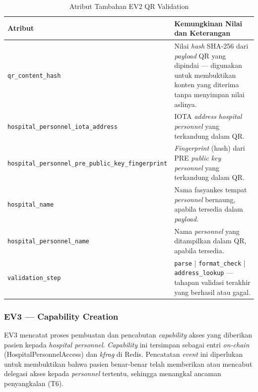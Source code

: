 \begin{table}[htbp]
\centering
\caption{Atribut Tambahan EV2 QR Validation}
\label{tab:ev2-detail}
\renewcommand{\arraystretch}{1.3}
\begin{tabular}{|p{4cm}|p{7.5cm}|}
\hline
\textbf{Atribut} & \textbf{Kemungkinan Nilai dan Keterangan} \\
\hline
\texttt{qr\_content\_hash} &
Nilai \textit{hash} SHA-256 dari \textit{payload} QR yang dipindai ---
digunakan untuk membuktikan konten yang diterima tanpa menyimpan nilai
aslinya. \\
\hline
\texttt{hospital\_personnel\_iota\_address} &
IOTA \textit{address} \textit{hospital personnel} yang terkandung dalam
QR. \\
\hline
\texttt{hospital\_personnel\_pre\_public\_key\_fingerprint} &
\textit{Fingerprint} (hash) dari PRE \textit{public key personnel} yang
terkandung dalam QR. \\
\hline
\texttt{hospital\_name} &
Nama fasyankes tempat \textit{personnel} bernaung, apabila tersedia dalam
\textit{payload}. \\
\hline
\texttt{hospital\_personnel\_name} &
Nama \textit{personnel} yang ditampilkan dalam QR, apabila tersedia. \\
\hline
\texttt{validation\_step} &
\texttt{parse} | \texttt{format\_check} | \texttt{address\_lookup} ---
tahapan validasi terakhir yang berhasil atau gagal. \\
\hline
\end{tabular}
\end{table}

\subsubsection{EV3 --- Capability Creation}
\label{subsec:ev3-capability-creation}

EV3 mencatat proses pembuatan dan pencabutan \textit{capability} akses yang
diberikan pasien kepada \textit{hospital personnel}. \textit{Capability} ini
tersimpan sebagai entri \textit{on-chain} (HospitalPersonnelAccess) dan \textit{kfrag}
di Redis. Pencatatan \textit{event} ini diperlukan untuk membuktikan bahwa
pasien benar-benar telah memberikan atau mencabut delegasi akses kepada
\textit{personnel} tertentu, sehingga menangkal ancaman penyangkalan (T6).

